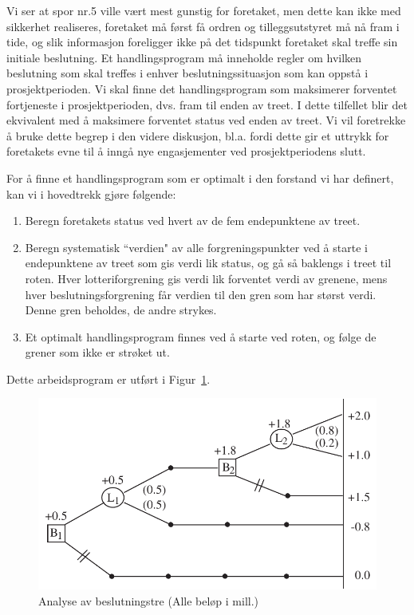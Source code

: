 {{Vi ser at spor nr.5 ville vært mest gunstig for foretaket, men dette 
kan ikke med sikkerhet realiseres, foretaket må først få 
ordren og tilleggsutstyret må nå fram i tide, og slik informasjon
foreligger ikke på det tidspunkt foretaket skal treffe sin initiale
beslutning.  Et handlingsprogram må inneholde regler om hvilken 
beslutning som skal treffes i enhver beslutningssituasjon som kan oppstå
i prosjektperioden.  Vi skal finne det handlingsprogram som maksimerer 
forventet fortjeneste i prosjektperioden, dvs. fram til enden av treet.
I dette tilfellet blir det ekvivalent med å maksimere forventet status
ved enden av treet.  Vi vil foretrekke å bruke dette begrep i den
videre diskusjon, bl.a. fordi dette gir et uttrykk for foretakets evne
til å inngå nye engasjementer ved prosjektperiodens slutt.

For å finne et handlingsprogram som er optimalt i den forstand vi har
definert, kan vi i hovedtrekk gjøre følgende:

\begin{enumerate}
\item Beregn foretakets status ved hvert av de fem endepunktene av treet.
\item Beregn systematisk ``verdien" av alle forgreningspunkter ved å 
      starte i endepunktene av treet som gis verdi lik status, og gå
      så baklengs i treet til roten.  Hver lotteriforgrening gis
      verdi lik forventet verdi av grenene, mens hver beslutningsforgrening
      får verdien til den gren som har størst verdi. Denne gren 
      beholdes, de andre strykes.
\item Et optimalt handlingsprogram finnes ved å starte ved roten, og
      følge de grener som ikke er strøket ut.
\end{enumerate}

\noindent Dette arbeidsprogram er utført i Figur~\ref{fig:analyse_tre}.
\begin{figure}[ht]
\centering
 \includegraphics[scale=0.8]{figurer/fig16_3.pdf} 
\caption{Analyse av beslutningstre (Alle beløp i mill.)}
	\label{fig:analyse_tre}
\end{figure}

}}
